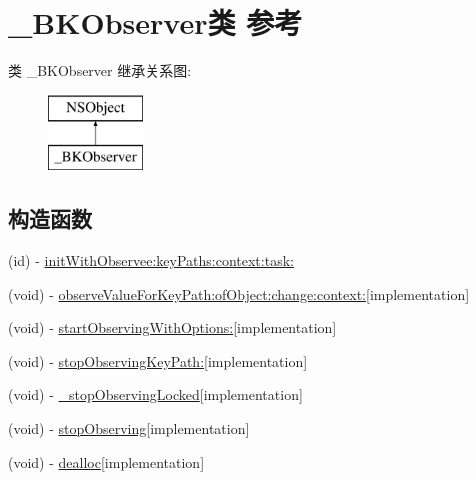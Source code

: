 \hypertarget{interface___b_k_observer}{}\section{\+\_\+\+B\+K\+Observer类 参考}
\label{interface___b_k_observer}
类 \+\_\+\+B\+K\+Observer 继承关系图\+:\begin{figure}[H]
\begin{center}
\leavevmode
\includegraphics[height=2.000000cm]{interface___b_k_observer}
\end{center}
\end{figure}
\subsection*{构造函数}
\begin{DoxyCompactItemize}
\item 
(id) -\/ \hyperlink{interface___b_k_observer_a4a3382dea1d7db53d36a804c100a6ce4}{init\+With\+Observee\+:key\+Paths\+:context\+:task\+:}
\item 
(void) -\/ \hyperlink{interface___b_k_observer_a6ea2074a7275ae6c2d8b6294d2813c48}{observe\+Value\+For\+Key\+Path\+:of\+Object\+:change\+:context\+:}{\ttfamily  \mbox{[}implementation\mbox{]}}
\item 
(void) -\/ \hyperlink{interface___b_k_observer_af07a342bc1371703e4a6fed683820d29}{start\+Observing\+With\+Options\+:}{\ttfamily  \mbox{[}implementation\mbox{]}}
\item 
(void) -\/ \hyperlink{interface___b_k_observer_ab39219e2dc87e1fb0cf297cd5b42abc5}{stop\+Observing\+Key\+Path\+:}{\ttfamily  \mbox{[}implementation\mbox{]}}
\item 
(void) -\/ \hyperlink{interface___b_k_observer_a549c8dec9fe77025cfef4201437f1e7c}{\+\_\+stop\+Observing\+Locked}{\ttfamily  \mbox{[}implementation\mbox{]}}
\item 
(void) -\/ \hyperlink{interface___b_k_observer_a4a13949775b74ed4b82800c379f4252a}{stop\+Observing}{\ttfamily  \mbox{[}implementation\mbox{]}}
\item 
(void) -\/ \hyperlink{interface___b_k_observer_a6315f95e1f354c2c70058ee926042538}{dealloc}{\ttfamily  \mbox{[}implementation\mbox{]}}
\end{DoxyCompactItemize}
